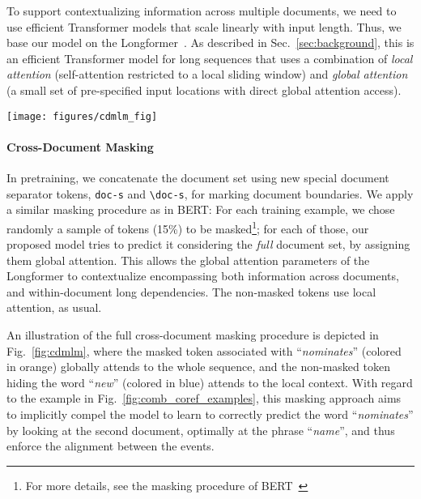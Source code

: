 \documentclass[11pt,a4paper]{article}
\begin{document}
To support contextualizing information across multiple documents, we need to use efficient Transformer models that scale linearly with input length. Thus, we base our model on the Longformer~\cite{beltagy2020longformer}. As described in Sec.~\ref{sec:background}, this is an efficient Transformer model for long sequences that uses a combination of \emph{local attention} (self-attention restricted to a local sliding window) and \emph{global attention} (a small set of pre-specified input locations with direct global attention access).

\begin{figure*}[tb!!]
\centering
\texttt{[image: figures/cdmlm\_fig]}
\caption{CD-LM pretraining: The input consists of concatenated documents, separated by the new special document separator tokens. The token colored in yellow represents global attention, and tokens colored in blue represent local attention. The goal is to predict the masked token given the output representation , based on the global context, i.e, the entire set of documents in the sample.} \label{fig:cdmlm}
    \vspace{-3mm}
\end{figure*}

\paragraph{Cross-Document Masking} In pretraining, we concatenate the document set using new special document separator tokens, {\tt doc-s} and {\tt \textbackslash doc-s}, for marking document boundaries. We apply a similar masking procedure as in BERT: For each training example, we chose randomly a sample of tokens (15\%) to be masked\footnote{For more details, see the masking procedure of BERT~\cite{devlin-etal-2019-bert}}; for each of those, our proposed model tries to predict it considering the \emph{full} document set, by assigning them global attention. This allows the global attention parameters of the Longformer to contextualize encompassing both information across documents, and within-document long dependencies. The non-masked tokens use local attention, as usual. 

An illustration of the full cross-document masking procedure is depicted in Fig.~\ref{fig:cdmlm}, where the masked token associated with ``\emph{nominates}'' (colored in orange) globally attends to the whole sequence, and the non-masked token hiding the word ``\emph{new}'' (colored in blue) attends to the local context. With regard to the example in Fig.~\ref{fig:comb_coref_examples}, this masking approach aims to implicitly compel the model to learn to correctly predict the word ``\emph{nominates}'' by looking at the second document, optimally at the phrase ``\emph{name}'', and thus enforce the alignment between the events. 
\end{document}
